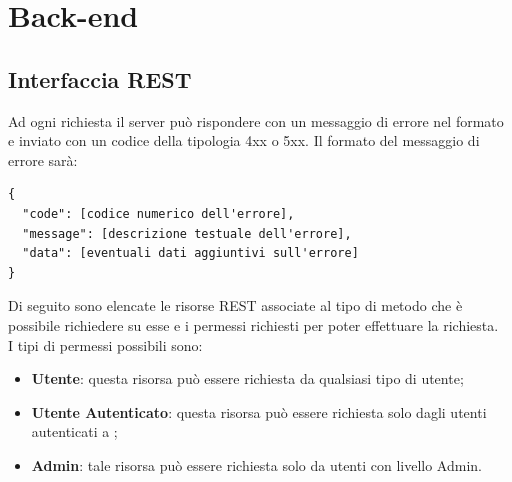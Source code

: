 \section{Back-end}

\subsection{Interfaccia REST}

Ad ogni richiesta il server può rispondere con un messaggio di errore nel formato  e inviato con un codice  della tipologia 4xx o 5xx. 
Il formato  del messaggio di errore sarà:
\begin{lstlisting}
{ 
  "code": [codice numerico dell'errore],
  "message": [descrizione testuale dell'errore],
  "data": [eventuali dati aggiuntivi sull'errore]
}
\end{lstlisting}
Di seguito sono elencate le risorse REST associate al tipo di metodo che è possibile richiedere su esse e i permessi richiesti per poter effettuare la richiesta. \\
I tipi di permessi possibili sono: 
\begin{itemize}
\item \textbf{Utente}: questa risorsa può essere richiesta da qualsiasi tipo di utente;
\item \textbf{Utente Autenticato}: questa risorsa può essere richiesta solo dagli utenti autenticati a ;
\item \textbf{Admin}: tale risorsa può essere richiesta solo da utenti con livello Admin.
\end{itemize}


